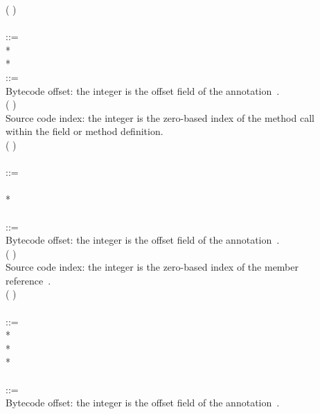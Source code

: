 \documentclass{article}
\begin{document}
\begin{tabbing}
\qquad    \bnfor{} (\bnflit{*} ) \\
\\
 ::= \\
\qquad    {}  \bnflit{:} * \lineend  \\
\qquad    {}*
\\
 ::= \\
\qquad    \bnfcmt Bytecode offset: the integer is the offset field of the annotation~\cite{JSR308-webpage-201310}. \\
\qquad    (\bnflit{\#} ) \\
\qquad    \bnfcmt Source code index: the integer is the zero-based index of the method call \\
\qquad    \bnfcmt within the field or method definition. \\
\qquad    \bnfor{} (\bnflit{*} ) \\
\\
 ::= \\
\qquad    {}  \bnflit{:} \lineend \\
\qquad    {}* \\
\\
 ::= \\
\qquad    \bnfcmt Bytecode offset: the integer is the offset field of the annotation~\cite{JSR308-webpage-201310}. \\
\qquad    (\bnflit{\#} ) \\
\qquad    \bnfcmt Source code index: the integer is the zero-based index of the member \\
\qquad    \bnfcmt reference~\cite{JSR308-webpage-201310}. \\
\qquad    \bnfor{} (\bnflit{*} ) \\
\\
 ::= \\
\qquad    {}  \bnflit{:} * \lineend \\
\qquad    {}* \\
\qquad    {}* \\
\\
 ::= \\
\qquad    \bnfcmt Bytecode offset: the integer is the offset field of the annotation~\cite{JSR308-webpage-201310}. \\

\end{tabbing}
\end{document}
